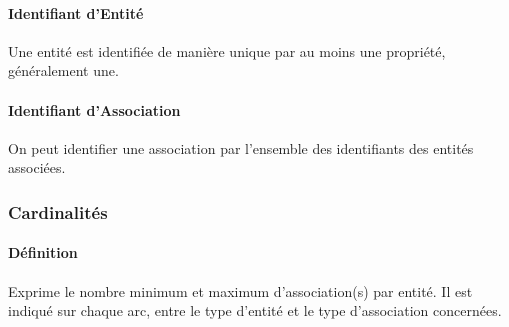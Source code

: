 \documentclass{article}
\begin{document}
\paragraph{Identifiant d'Entité}Une entité est identifiée de manière unique par au moins une propriété, généralement une.

\paragraph{Identifiant d'Association}On peut identifier une association par l'ensemble des identifiants des entités associées.

\subsubsection{Cardinalités}
\paragraph{Définition}Exprime le nombre minimum et maximum d'association(s) par entité. Il est indiqué sur chaque arc, entre le type d'entité et le type d'association concernées.
\end{document}
